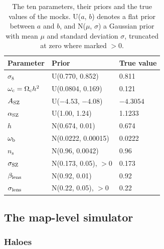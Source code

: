 \begin{table}
\centering
\caption{The ten parameters, their priors and the true values of the mocks. U($a$, $b$) denotes a flat
prior between $a$ and $b$, and N($\mu$, $\sigma$) a Gaussian prior with mean $\mu$ and standard deviation
$\sigma$, truncated at zero where marked $>0$.}
\label{tab:prior}
\small
\begin{tabular}{lll}
\toprule
Parameter & Prior & True value \\
\midrule
$\sigma_8$                         & U(0.770, 0.852)          & 0.811 \\
$\omega_\mathrm{c}=\Omega_\mathrm{c} h^2$       & U(0.0804, 0.169)         & 0.121 \\
$A_\mathrm{SZ}$                             & U($-4.53$, $-4.08$)      & $-4.3054$ \\
$\alpha_\mathrm{SZ}$                            & U(1.00, 1.24)            & 1.1233 \\
$h$                                & N(0.674, 0.01)           & 0.674 \\
$\omega_\mathrm{b}$                             & N(0.0222, 0.00015)       & 0.0222 \\
$n_\mathrm{s}$                     & N(0.96, 0.0042)          & 0.96 \\
$\sigma_\mathrm{SZ}$                             & N(0.173, 0.05), $>0$     & 0.173 \\
$\beta_\mathrm{lens}$                           & N(0.92, 0.01)            & 0.92 \\
$\sigma_\mathrm{lens}$                           & N(0.22, 0.05), $>0$      & 0.22 \\
\bottomrule
\end{tabular}
\end{table}

\subsection{The map-level simulator}\label{sec:sims:maps}

\subsubsection{Haloes}

